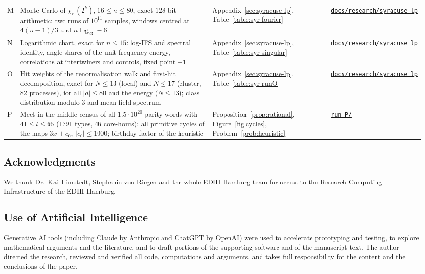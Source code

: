 \documentclass[12pt]{amsart}
\theoremstyle{definition}
\theoremstyle{remark}
\begin{document}
\begin{longtable}{@{}P{0.8cm}P{7.55cm}P{3.35cm}P{2.65cm}@{}}
M & Monte Carlo of $\chi_n(2^k)$, $16\le n\le80$, exact $128$-bit arithmetic: two runs of $10^{11}$ samples, windows centred at $4(n-1)/3$ and $n\log_23-6$ & Appendix~\ref{sec:syracuse-lp}, Table~\ref{table:syr-fourier} & \href{https://github.com/Sultanow/collatz/tree/master/07\%20Basins\%20of\%20Attraction/docs/research/syracuse_lp}{\texttt{docs/research/\allowbreak syracuse\_lp}} \\
N & Logarithmic chart, exact for $n\le15$: log-IFS and spectral identity, angle shares of the unit-frequency energy, correlations at intertwiners and controls, fixed point $-1$ & Appendix~\ref{sec:syracuse-lp}, Table~\ref{table:syr-singular} & \href{https://github.com/Sultanow/collatz/tree/master/07\%20Basins\%20of\%20Attraction/docs/research/syracuse_lp}{\texttt{docs/research/\allowbreak syracuse\_lp}} \\
O & Hit weights of the renormalisation walk and first-hit decomposition, exact for $N\le13$ (local) and $N\le17$ (cluster, 82 processes), for all $|d|\le80$ and the energy ($N\le13$); class distribution modulo $3$ and mean-field spectrum & Appendix~\ref{sec:syracuse-lp}, Table~\ref{table:syr-runO} & \href{https://github.com/Sultanow/collatz/tree/master/07\%20Basins\%20of\%20Attraction/docs/research/syracuse_lp}{\texttt{docs/research/\allowbreak syracuse\_lp}} \\
P & Meet-in-the-middle census of all $1.5\cdot10^{20}$ parity words with $41\le l\le66$ ($1391$ types, $46$ core-hours): all primitive cycles of the maps $3x+c_0$, $|c_0|\le1000$; birthday factor of the heuristic & Proposition~\ref{prop:rational}, Figure~\ref{fig:cycles}, Problem~\ref{prob:heuristic} & \href{https://github.com/Sultanow/collatz/tree/master/07\%20Basins\%20of\%20Attraction/results/run_P}{\texttt{run\_P/}} \\
\end{longtable}
\endgroup


\subsection*{Acknowledgments}
We thank Dr.\ Kai Himstedt, Stephanie von Riegen and the whole EDIH Hamburg team for access to the Research Computing Infrastructure of the EDIH Hamburg.

\subsection*{Use of Artificial Intelligence}
Generative AI tools (including Claude by Anthropic and ChatGPT by OpenAI) were used to accelerate prototyping and testing, to explore mathematical arguments and the literature, and to draft portions of the supporting software and of the manuscript text. The author directed the research, reviewed and verified all code, computations and arguments, and takes full responsibility for the content and the conclusions of the paper.
\end{document}
